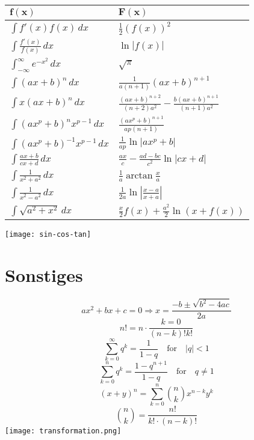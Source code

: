\begin{center}
  \begin{tabularx}{\linewidth}{>{\centering\arraybackslash}X>{\centering\arraybackslash}X}
    $\mathbf{f(x)}$                        & $\mathbf{F(x)}$                                                  \\
    \midrule
    $\int f'(x) f(x) \, dx$                & $\frac{1}{2}(f(x))^2$                                            \\
    $\int \frac{f'(x)}{f(x)} \, dx$        & $\ln|f(x)|$                                                      \\
    $\int_{-\infty}^\infty e^{-x^2} \, dx$ & $\sqrt{\pi}$                                                     \\
    $\int (ax+b)^n \, dx$                  & $\frac{1}{a(n+1)}(ax+b)^{n+1}$                                   \\
    $\int x(ax+b)^n \, dx$                 & $\frac{(ax+b)^{n+2}}{(n+2)a^2} - \frac{b(ax+b)^{n+1}}{(n+1)a^2}$ \\
    $\int (ax^p+b)^n x^{p-1} \, dx$        & $\frac{(ax^p+b)^{n+1}}{ap(n+1)}$                                 \\
    $\int (ax^p + b)^{-1} x^{p-1} \, dx$   & $\frac{1}{ap} \ln |ax^p + b|$                                    \\
    $\int \frac{ax+b}{cx+d} \, dx$         & $\frac{ax}{c} - \frac{ad-bc}{c^2} \ln |cx +d|$                   \\
    $\int \frac{1}{x^2+a^2} \, dx$         & $\frac{1}{a} \arctan \frac{x}{a}$                                \\
    $\int \frac{1}{x^2 - a^2} \, dx$       & $\frac{1}{2a} \ln\left| \frac{x-a}{x+a} \right|$                 \\
    $\int \sqrt{a^2+x^2} \, dx $           & $\frac{x}{2}f(x) + \frac{a^2}{2}\ln(x+f(x))$                     \\
    \bottomrule
  \end{tabularx}
\end{center}

\texttt{[image: sin-cos-tan]}

\section{Sonstiges}
\[ax^2 + bx + c = 0 \Rightarrow x = \frac{-b \pm \sqrt{b^2 - 4ac}}{2a}\]
\[n! = n \cdot \frac{k=0}{(n - k)!k!}\]
\[\sum_{k=0}^\infty q^k = \frac{1}{1 - q} \quad \text{for} \quad |q| < 1\]
\[\sum_{k=0}^n q^k = \frac{1 - q^{n+1}}{1 - q} \quad \text{for} \quad q \neq 1\]
\[(x + y)^n = \sum_{k=0}^n \binom{n}{k} x^{n-k} y^k\]
\[\binom{n}{k} = \frac{n!}{k! \cdot  (n - k)!}\]
\texttt{[image: transformation.png]}

